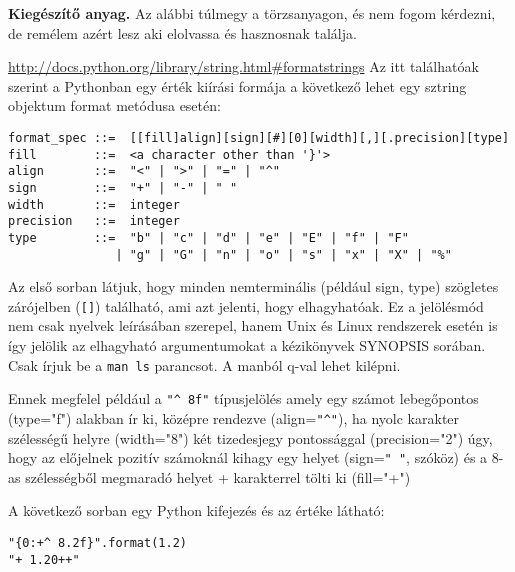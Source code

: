 \documentclass[a4paper]{article}
\begin{document}
\begin{leftbar}
\small
\textbf{Kiegészítő anyag.}
Az alábbi túlmegy a törzsanyagon, és nem fogom kérdezni, de remélem azért lesz
aki elolvassa és hasznosnak találja.

\url{http://docs.python.org/library/string.html#formatstrings} Az itt
találhatóak szerint a Pythonban egy érték kiírási formája a következő lehet egy
sztring objektum format metódusa esetén:

\begin{verbatim}
format_spec ::=  [[fill]align][sign][#][0][width][,][.precision][type]
fill        ::=  <a character other than '}'>
align       ::=  "<" | ">" | "=" | "^"
sign        ::=  "+" | "-" | " "
width       ::=  integer
precision   ::=  integer
type        ::=  "b" | "c" | "d" | "e" | "E" | "f" | "F"
               | "g" | "G" | "n" | "o" | "s" | "x" | "X" | "%"
\end{verbatim}

Az első sorban látjuk, hogy minden nemterminális (például sign, type) szögletes
zárójelben (\verb+[]+) található, ami azt jelenti, hogy elhagyhatóak.
{\footnotesize Ez a jelölésmód nem csak nyelvek leírásában szerepel, hanem Unix
és Linux rendszerek esetén is így jelölik az elhagyható argumentumokat a
kézikönyvek SYNOPSIS sorában. Csak írjuk be a \texttt{man ls} parancsot.
\scriptsize A manból q-val lehet kilépni.}

Ennek megfelel például a \verb+"^ 8f"+ típusjelölés amely egy számot lebegőpontos
(type="f") alakban ír ki, középre rendezve (align=\verb+"^"+), ha nyolc
karakter szélességű helyre (width="8") két tizedesjegy pontossággal
(precision="2") úgy, hogy az előjelnek pozitív számoknál kihagy egy helyet
(sign=\verb'" "', szóköz) és a 8-as szélességből megmaradó helyet + karakterrel
tölti ki (fill="+")

A következő sorban egy Python kifejezés és az értéke látható:
\begin{verbatim}
"{0:+^ 8.2f}".format(1.2)
"+ 1.20++"
\end{verbatim}
\end{leftbar}
\end{document}
